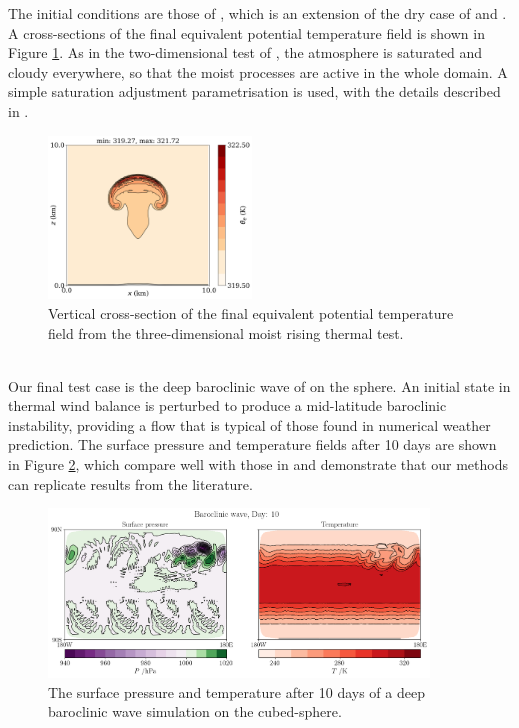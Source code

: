 \documentclass[journal abbreviation, manuscript]{copernicus}
\begin{document}
The initial conditions are those of \citet{bendall2020compatible}, which is an extension of the dry case of \citet{kelly2012continuous} and \citet{melvin2019mixed}.
A cross-sections of the final equivalent potential temperature field is shown in Figure \ref{fig:3d_bubble}.
As in the two-dimensional test of \citet{bryan2002benchmark}, the atmosphere is saturated and cloudy everywhere, so that the moist processes are active in the whole domain.
A simple saturation adjustment parametrisation is used, with the details described in \citet{bendall2020compatible}.
\\
\begin{figure}[htp!]
\centering
\includegraphics[width=0.48\textwidth]{figures/moist_3d_bubble.png}
\caption{Vertical cross-section of the final equivalent potential temperature field from the three-dimensional moist rising thermal test.
}
\label{fig:3d_bubble}
\end{figure}
\\
Our final test case is the deep baroclinic wave of \citet{ullrich2014proposed} on the sphere.
An initial state in thermal wind balance is perturbed to produce a mid-latitude baroclinic instability, providing a flow that is typical of those found in numerical weather prediction.
The surface pressure and temperature fields after 10 days are shown in Figure \ref{fig:baroclinic}, which compare well with those in \citet{melvin2024mixed} and demonstrate that our methods can replicate results from the literature.

\begin{figure}[htp!]
\centering
\includegraphics[width=0.9\textwidth]{figures/baroclinic_wave_lonlat.png}
\caption{The surface pressure and temperature after 10 days of a deep baroclinic wave simulation on the cubed-sphere.}
\label{fig:baroclinic}
\end{figure}
\end{document}
